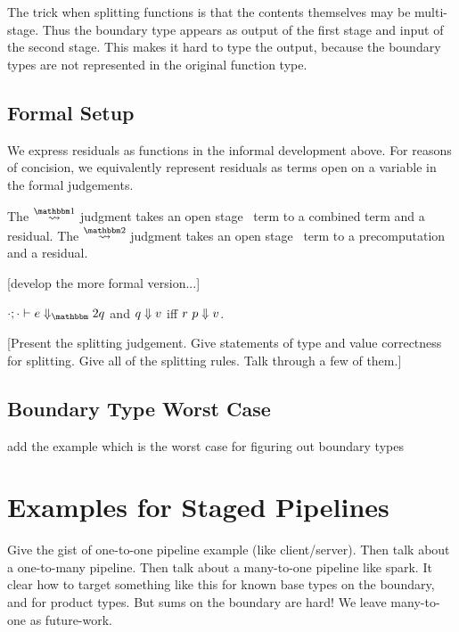 The trick when splitting functions is that the contents themselves may be multi-stage.
Thus the boundary type appears as output of the first stage and input of the second stage.
This makes it hard to type the output, because the boundary types are not represented in the original function type.

\subsection {Formal Setup}

We express residuals as functions in the informal development above.
For reasons of concision, we equivalently represent residuals as terms open on a variable in the formal judgements.

The $\splitonesym$ judgment takes an open stage \bbone\ term to a combined term and a residual.
The $\splittwosym$ judgment takes an open stage \bbtwo\ term to a precomputation and a residual.

[develop the more formal version...]

  $\diatwo [\cdot;\cdot] e q$ and ${q} \Downarrow {v}$ iff ${r~p} \Downarrow {v}$.

[Present the splitting judgement.  Give statements of type and value correctness for splitting.  Give all of the splitting rules.  Talk through a few of them.]

\subsection {Boundary Type Worst Case}

\TODO add the example which is the worst case for figuring out boundary types



\section{Examples for Staged Pipelines}

Give the gist of one-to-one pipeline example (like client/server).
Then talk about a one-to-many pipeline.
Then talk about a many-to-one pipeline like spark.  It clear how to target something like this for known base types on the boundary, and for product types.  But sums on the boundary are hard!  We leave many-to-one as future-work.
